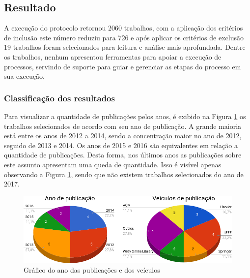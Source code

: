 \subsection{Resultado}\label{sub:trabalhosRelacionados_resultados}
A execução do protocolo retornou 2060 trabalhos, com a aplicação dos critérios de inclusão este número reduziu para 726 e após aplicar os critérios de exclusão 19 trabalhos foram selecionados para leitura e análise mais aprofundada. Dentre os trabalhos, nenhum apresentou ferramentas para apoiar a execução de processos, servindo de suporte para guiar e gerenciar as etapas do processo em sua execução.


\subsubsection{Classificação dos resultados}
Para visualizar a quantidade de publicações pelos anos, é exibido na Figura \ref{fig:graf} os trabalhos selecionados de acordo com seu ano de publicação. A grande maioria está entre os anos de 2012 a 2014, sendo a concentração maior no ano de 2012, seguido de 2013 e 2014. Os anos de 2015 e 2016 são equivalentes em relação a quantidade de publicações. Desta forma, nos últimos anos as publicações sobre este assunto apresentam uma queda de quantidade. Isso é visível apenas observando a Figura \ref{fig:graf}, sendo que não existem trabalhos selecionados do ano de 2017.
\begin{figure}[!htb]
	\caption{Gráfico do ano das publicações e dos veículos}\label{fig:graf}
	\begin{center}
		\includegraphics[scale=0.5]{img/graf}
	\end{center}
\end{figure}

